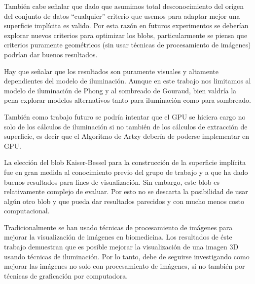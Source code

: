 También cabe señalar que dado que asumimos total desconocimiento del origen del conjunto de datos ``cualquier'' criterio que usemos para adaptar mejor una superficie implícita es valido. Por esta razón en futuros experimentos se deberían explorar nuevos criterios para optimizar los blobs, particularmente se piensa que criterios puramente geométricos (sin usar técnicas de procesamiento de imágenes) podrían dar buenos resultados.

Hay que señalar que los resultados son puramente visuales y altamente dependientes del modelo de iluminación. Aunque en este trabajo nos limitamos al modelo de iluminación de Phong y al sombreado de Gouraud, bien valdría la pena explorar modelos alternativos tanto para iluminación como para sombreado.

También como trabajo futuro se podría intentar que el GPU se hiciera cargo no solo de los cálculos de iluminación si no también de los cálculos de extracción de superficie, es decir que el Algoritmo de Artzy debería de poderse implementar en GPU.

La elección del blob Kaiser-Bessel para la construcción de la superficie implícita fue en gran medida al conocimiento previo del grupo de trabajo y a que ha dado buenos resultados para fines de visualización. Sin embargo, este blob es relativamente complejo de evaluar. Por esto no se descarta la posibilidad de usar algún otro blob y que pueda dar resultados parecidos y con mucho menos costo computacional.

Tradicionalmente se han usado técnicas de procesamiento de imágenes para mejorar la visualización de imágenes en biomedicina. Los resultados de éste trabajo demuestran que es posible mejorar la visualización de una imagen 3D usando técnicas de iluminación. Por lo tanto, debe de seguirse investigando como mejorar las imágenes  no solo con procesamiento de imágenes, si no también por técnicas de graficación por computadora. 